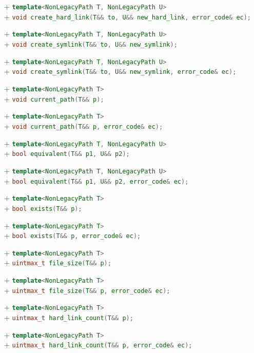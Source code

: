 \documentclass[11pt]{article}
\newcommand{\code}[2][cpp]{\lstinline[language=#1,basicstyle=\small\ttfamily]{#2}}
\newcommand{\tsreplace}[3]{\textcolor{red}{\sout{#1}}#2\textcolor{darkgreen}{#3}}
\begin{document}
\tsreplace{}{}{+ \code{template<NonLegacyPath T, NonLegacyPath U>}}\\
\tsreplace{}{}{+ \code{void create_hard_link(T&& to, U&& new_hard_link, error_code& ec);}}

\tsreplace{}{}{+ \code{template<NonLegacyPath T, NonLegacyPath U>}}\\
\tsreplace{}{}{+ \code{void create_symlink(T&& to, U&& new_symlink);}}

\tsreplace{}{}{+ \code{template<NonLegacyPath T, NonLegacyPath U>}}\\
\tsreplace{}{}{+ \code{void create_symlink(T&& to, U&& new_symlink, error_code& ec);}}

\tsreplace{}{}{+ \code{template<NonLegacyPath T>}}\\
\tsreplace{}{}{+ \code{void current_path(T&& p);}}

\tsreplace{}{}{+ \code{template<NonLegacyPath T>}}\\
\tsreplace{}{}{+ \code{void current_path(T&& p, error_code& ec);}}

\tsreplace{}{}{+ \code{template<NonLegacyPath T, NonLegacyPath U>}}\\
\tsreplace{}{}{+ \code{bool equivalent(T&& p1, U&& p2);}}

\tsreplace{}{}{+ \code{template<NonLegacyPath T, NonLegacyPath U>}}\\
\tsreplace{}{}{+ \code{bool equivalent(T&& p1, U&& p2, error_code& ec);}}

\tsreplace{}{}{+ \code{template<NonLegacyPath T>}}\\
\tsreplace{}{}{+ \code{bool exists(T&& p);}}

\tsreplace{}{}{+ \code{template<NonLegacyPath T>}}\\
\tsreplace{}{}{+ \code{bool exists(T&& p, error_code& ec);}}

\tsreplace{}{}{+ \code{template<NonLegacyPath T>}}\\
\tsreplace{}{}{+ \code{uintmax_t file_size(T&& p);}}

\tsreplace{}{}{+ \code{template<NonLegacyPath T>}}\\
\tsreplace{}{}{+ \code{uintmax_t file_size(T&& p, error_code& ec);}}

\tsreplace{}{}{+ \code{template<NonLegacyPath T>}}\\
\tsreplace{}{}{+ \code{uintmax_t hard_link_count(T&& p);}}

\tsreplace{}{}{+ \code{template<NonLegacyPath T>}}\\
\tsreplace{}{}{+ \code{uintmax_t hard_link_count(T&& p, error_code& ec);}}
\end{document}
